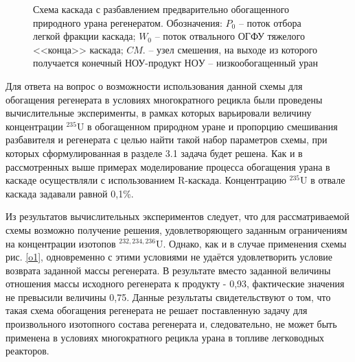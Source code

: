 \begin{figure}[ht]
  \caption{Схема каскада с разбавлением предварительно обогащенного природного урана регенератом. Обозначения: $P_0$ -- поток отбора легкой фракции каскада; $W_0$ -- поток отвального ОГФУ тяжелого <<конца>> каскада; $CM.$ -- узел смешения, на выходе из которого получается конечный НОУ-продукт $НОУ$  -- низкообогащенный уран}\label{o2}
\end{figure}

Для ответа на вопрос о возможности использования данной схемы для обогащения регенерата в условиях многократного рецикла были проведены вычислительные эксперименты, в рамках которых варьировали величину концентрации $^{235}$U в обогащенном природном уране и пропорцию смешивания разбавителя и регенерата с целью найти такой набор параметров схемы, при которых сформулированная в разделе 3.1 задача будет решена. Как и в рассмотренных выше примерах моделирование процесса обогащения урана в каскаде осуществляли с использованием R-каскада. Концентрацию $^{235}$U в отвале каскада задавали равной 0,1\%.

Из результатов вычислительных экспериментов следует, что для рассматриваемой схемы возможно получение решения, удовлетворяющего заданным ограничениям на концентрации изотопов $^{232,234,236}$U. Однако, как и в случае применения схемы рис. \ref{o1}, одновременно с этими условиями не удаётся удовлетворить условие возврата заданной массы регенерата. В результате вместо заданной величины отношения массы исходного регенерата к продукту - 0,93, фактические значения не превысили величины 0,75. Данные результаты свидетельствуют о том, что такая схема обогащения регенерата не решает поставленную задачу для произвольного изотопного состава регенерата и, следовательно, не может быть применена в условиях многократного рецикла урана в топливе легководных реакторов.

